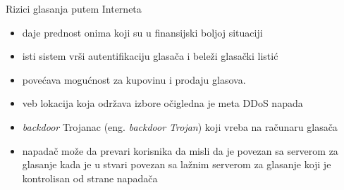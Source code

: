     
    \begin{frame}{Rizici glasanja putem Interneta}
    	\begin{itemize}
			\item daje prednost onima koji su u finansijski boljoj situaciji
			\item isti sistem vrši autentifikaciju glasača i beleži glasački listić
			\item povećava mogućnost za kupovinu i prodaju glasova.
			\item veb lokacija koja održava izbore očigledna je meta DDoS napada
			\item \textit{backdoor} Trojanac (eng. {\em backdoor Trojan}) koji vreba na računaru glasača
			\item napadač može da prevari korisnika da misli da je povezan sa serverom za glasanje kada je u stvari povezan sa lažnim serverom za glasanje koji je kontrolisan od strane napadača	
		\end{itemize}
    \end{frame}